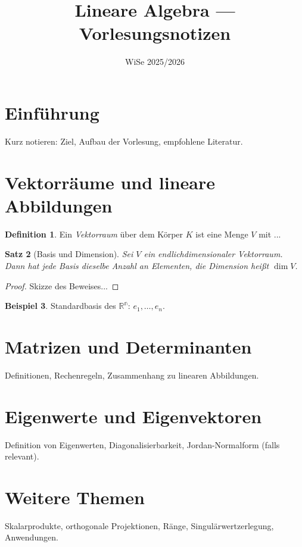 \documentclass[a4paper,11pt,oneside]{scrartcl}
\title{Lineare Algebra --- Vorlesungsnotizen}
\date{WiSe 2025/2026}
\theoremstyle{plain}
\newtheorem{satz}{Satz}[section]
\theoremstyle{definition}
\newtheorem{definition}[satz]{Definition}
\newtheorem{beispiel}[satz]{Beispiel}
\begin{document}
\maketitle
\tableofcontents
\bigskip

\section{Einführung}
Kurz notieren: Ziel, Aufbau der Vorlesung, empfohlene Literatur.

\section{Vektorräume und lineare Abbildungen}
\begin{definition}
Ein \emph{Vektorraum} über dem Körper \(K\) ist eine Menge \(V\) mit ...
\end{definition}

\begin{satz}[Basis und Dimension]
Sei \(V\) ein endlichdimensionaler Vektorraum. Dann hat jede Basis dieselbe Anzahl an Elementen, die Dimension heißt \(\dim V\).
\end{satz}

\begin{proof}
Skizze des Beweises...
\end{proof}

\begin{beispiel}
Standardbasis des $\mathbb{R^n}$: $e_1,\dots,e_n$.
\end{beispiel}

\section{Matrizen und Determinanten}
Definitionen, Rechenregeln, Zusammenhang zu linearen Abbildungen.

\section{Eigenwerte und Eigenvektoren}
Definition von Eigenwerten, Diagonalisierbarkeit, Jordan-Normalform (falls relevant).

\section{Weitere Themen}
Skalarprodukte, orthogonale Projektionen, Ränge, Singulärwertzerlegung, Anwendungen.

\end{document}
